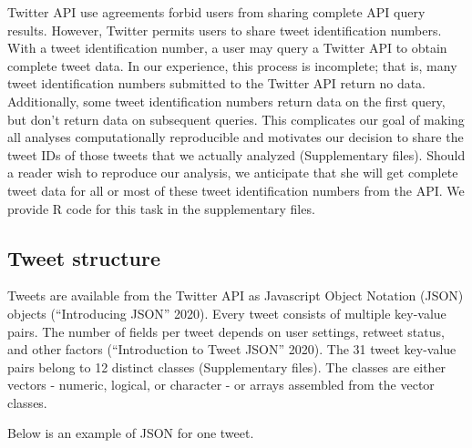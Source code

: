 \documentclass[
]{article}
\begin{document}
Twitter API use agreements forbid users from sharing complete API query results.
However, Twitter permits users to share tweet identification numbers. With a tweet
identification number, a user may query a Twitter API to obtain complete tweet data. In our
experience, this
process is incomplete; that is, many tweet identification numbers submitted to the Twitter API return
no data. Additionally, some tweet identification numbers return data on the first query, but don't return data on subsequent queries. This complicates our goal of making all analyses computationally
reproducible and motivates our decision to share the tweet IDs of those tweets that
we actually analyzed (Supplementary files). Should a reader wish to reproduce
our analysis, we anticipate that she will get complete tweet data
for all or most of these tweet identification numbers from the API. We provide
R code for this task in the supplementary files.

\hypertarget{tweet-structure}{%
\subsection{Tweet structure}\label{tweet-structure}}

Tweets are available from the Twitter API as Javascript Object Notation (JSON) objects (``Introducing JSON'' 2020).
Every tweet consists
of multiple key-value pairs. The number of fields per
tweet depends on user settings, retweet status, and other factors (``Introduction to Tweet JSON'' 2020).
The 31 tweet key-value pairs belong to
12 distinct classes (Supplementary files). The
classes are either vectors - numeric, logical, or character - or arrays assembled
from the vector classes.

Below is an example of JSON for one tweet.
\end{document}
